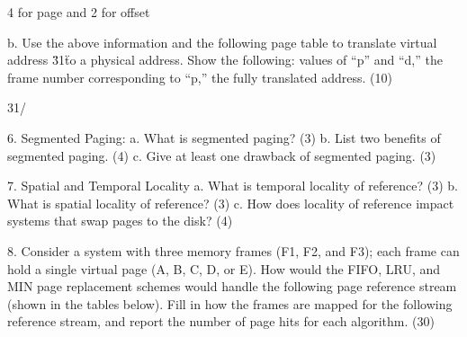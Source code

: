 4 for page and 2 for offset

b. Use the above information and the following page table to translate virtual address \"31\" to a physical address. Show the following: values of “p” and “d,” the frame number corresponding to “p,” the fully translated address. (10) 

31/

6. Segmented Paging:
a. What is segmented paging? (3) 
b. List two benefits of segmented paging. (4) 
c. Give at least one drawback of segmented paging. (3) 



7. Spatial and Temporal Locality
a. What is temporal locality of reference? (3)
b. What is spatial locality of reference? (3)
c. How does locality of reference impact systems that swap pages to the disk? (4)



8. Consider a system with three memory frames (F1, F2, and F3); each frame can hold a single virtual page (A, B, C, D, or E). How would the FIFO, LRU, and MIN page replacement schemes would handle the following page reference stream (shown in the tables below). Fill in how the frames are mapped for the following reference stream, and report the number of page hits for each algorithm. (30)


